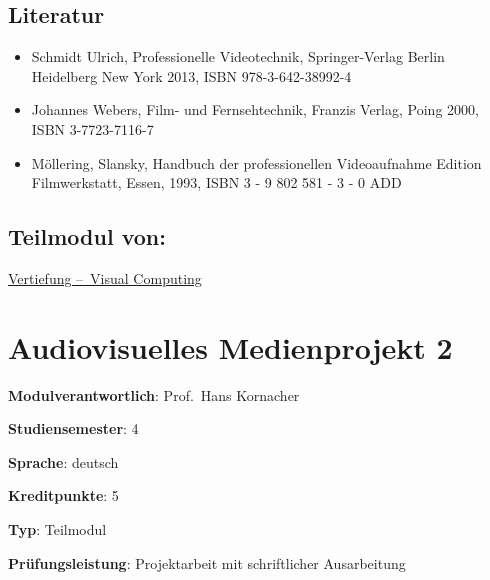 \hypertarget{literaturpathlabelmi-2017modulbeschreibungen-bachelorba_vc-audiovisuelle-medientechnik}{%
\section*{Literatur\label{/mi-2017/modulbeschreibungen-bachelor/BA_VC-audiovisuelle-medientechnik}}\label{literaturpathlabelmi-2017modulbeschreibungen-bachelorba_vc-audiovisuelle-medientechnik}}

\begin{itemize}
\tightlist
\item
  Schmidt Ulrich, Professionelle Videotechnik, Springer-Verlag Berlin
  Heidelberg New York 2013, ISBN 978-3-642-38992-4
\item
  Johannes Webers, Film- und Fernsehtechnik, Franzis Verlag, Poing 2000,
  ISBN 3-7723-7116-7
\item
  Möllering, Slansky, Handbuch der professionellen Videoaufnahme Edition
  Filmwerkstatt, Essen, 1993, ISBN 3 - 9 802 581 - 3 - 0 ADD
\end{itemize}

\hypertarget{teilmodul-vonpathlabelmi-2017modulbeschreibungen-bachelorba_vc-audiovisuelle-medientechnik}{%
\section*{Teilmodul
von:\label{/mi-2017/modulbeschreibungen-bachelor/BA_VC-audiovisuelle-medientechnik}}\label{teilmodul-vonpathlabelmi-2017modulbeschreibungen-bachelorba_vc-audiovisuelle-medientechnik}}

\hyperref[/mi-2017/modulbeschreibungen-bachelor/BA_Vertiefung-Visual-Computing]{Vertiefung – Visual Computing}

\hypertarget{audiovisuelles-medienprojekt-2pathlabelmi-2017modulbeschreibungen-bachelorba_vc-audiovisuelles-medienprojekt-2}{%
\chapter{Audiovisuelles Medienprojekt
2\label{/mi-2017/modulbeschreibungen-bachelor/BA_VC-audiovisuelles-medienprojekt-2}}\label{audiovisuelles-medienprojekt-2pathlabelmi-2017modulbeschreibungen-bachelorba_vc-audiovisuelles-medienprojekt-2}}

\begin{modulHead}
\textbf{Modulverantwortlich}: Prof.~Hans
Kornacher
\end{modulHead}
\begin{modulHead}
\textbf{Studiensemester}:
4
\end{modulHead}
\begin{modulHead}
\textbf{Sprache}:
deutsch
\end{modulHead}
\begin{modulHead}
\textbf{Kreditpunkte}:
5
\end{modulHead}
\begin{modulHead}
\textbf{Typ}:
Teilmodul
\end{modulHead}
\begin{modulHead}
\textbf{Prüfungsleistung}:
Projektarbeit mit schriftlicher Ausarbeitung
\end{modulHead}


